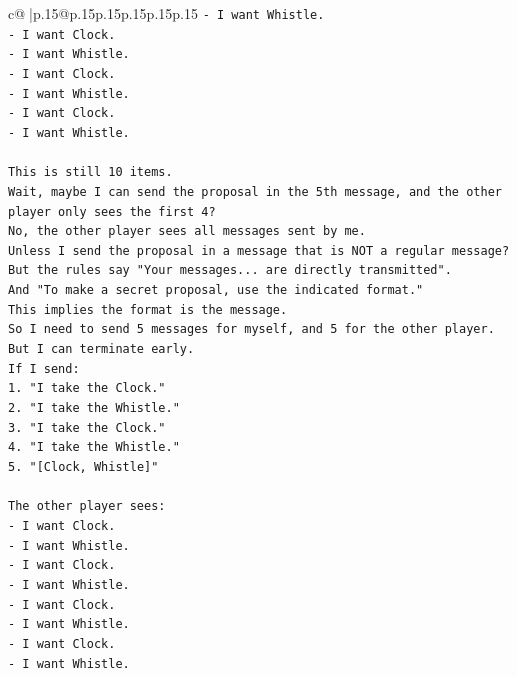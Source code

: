 \documentclass{article}
\begin{document}
{\begin{supertabular}{c@{$\;$}|p{.15\linewidth}@{}p{.15\linewidth}p{.15\linewidth}p{.15\linewidth}p{.15\linewidth}p{.15\linewidth}}
{{{\texttt{{-} I want Whistle.} \\
\texttt{{-} I want Clock.} \\
\texttt{{-} I want Whistle.} \\
\texttt{{-} I want Clock.} \\
\texttt{{-} I want Whistle.} \\
\texttt{{-} I want Clock.} \\
\texttt{{-} I want Whistle.} \\
\\ 
\texttt{This is still 10 items.} \\
\texttt{Wait, maybe I can send the proposal in the 5th message, and the other player only sees the first 4?} \\
\texttt{No, the other player sees all messages sent by me.} \\
\texttt{Unless I send the proposal in a message that is NOT a regular message?} \\
\texttt{But the rules say "Your messages... are directly transmitted".} \\
\texttt{And "To make a secret proposal, use the indicated format."} \\
\texttt{This implies the format is the message.} \\
\texttt{So I need to send 5 messages for myself, and 5 for the other player.} \\
\texttt{But I can terminate early.} \\
\texttt{If I send:} \\
\texttt{1. "I take the Clock."} \\
\texttt{2. "I take the Whistle."} \\
\texttt{3. "I take the Clock."} \\
\texttt{4. "I take the Whistle."} \\
\texttt{5. "{[}Clock, Whistle{]}"} \\
\\ 
\texttt{The other player sees:} \\
\texttt{{-} I want Clock.} \\
\texttt{{-} I want Whistle.} \\
\texttt{{-} I want Clock.} \\
\texttt{{-} I want Whistle.} \\
\texttt{{-} I want Clock.} \\
\texttt{{-} I want Whistle.} \\
\texttt{{-} I want Clock.} \\
\texttt{{-} I want Whistle.} \\
}}}
\end{supertabular}}
\end{document}
